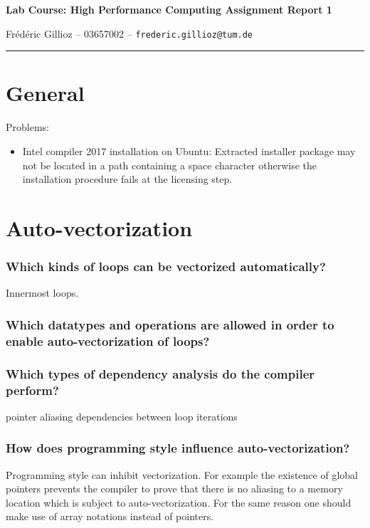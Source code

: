 \documentclass[11pt]{article}
\makeatletter
\newcommand{\hwhead}[4]{
\begin{center}
\sffamily\large\bfseries Lab Course: High Performance Computing Assignment Report #1
\vspace{2mm} 
\normalfont

#2 -- #3 -- \texttt{#4}
\end{center}
\vspace{6mm} \hrule \vspace{4mm}
}
\newcommand{\name}{Frédéric Gillioz} %
\newcommand{\imat}{03657002} %
\newcommand{\email}{frederic.gillioz@tum.de} %
\makeatother
\begin{document}
\hwhead{1}{\name}{\imat}{\email}


\setcounter{section}{-1}
\section{General}

Problems:
\begin{itemize}
\item Intel compiler 2017 installation on Ubuntu: Extracted installer package may not be located in a path containing a space character otherwise the installation procedure fails at the licensing step.
\end{itemize}

\section{Auto-vectorization}

\subsubsection*{Which kinds of loops can be vectorized automatically?}
Innermost loops.

\subsubsection*{Which datatypes and operations are allowed in order to enable auto-vectorization of loops?}

\subsubsection*{Which types of dependency analysis do the compiler perform?}

pointer aliasing
dependencies between loop iterations

\subsubsection*{How does programming style influence auto-vectorization?}
Programming style can inhibit vectorization. For example the existence of global pointers prevents the compiler to prove that there is no aliasing to a memory location which is subject to auto-vectorization. For the same reason one should make use of array notations instead of pointers.
\end{document}
